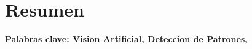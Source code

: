 \chapter*{Resumen}
\label{chap:resumen}


\textbf{Palabras clave: Vision Artificial, Deteccion de Patrones, }


